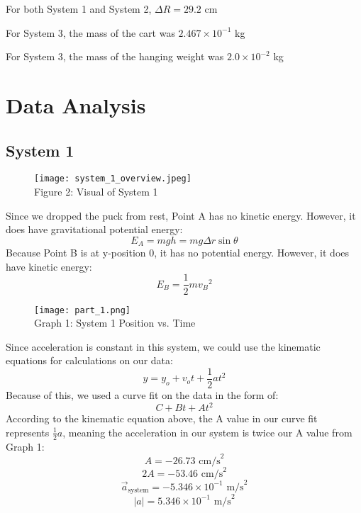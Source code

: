 \documentclass[fleqn]{article}
\begin{document}
For both System 1 and System 2, $\Delta R=29.2$ cm

For System 3, the mass of the cart was $2.467 \times 10^{-1}$ kg

For System 3, the mass of the hanging weight was $2.0 \times 10^{-2}$ kg

\section*{Data Analysis}
\subsection*{System 1}
\begin{figure}[H]
	\texttt{[image: system\_1\_overview.jpeg]}
	\\Figure 2: Visual of System 1
\end{figure}

Since we dropped the puck from rest, Point A has no kinetic energy. However, it does have gravitational potential energy:
\[ E_A=mgh=mg \Delta r \sin \theta \]
Because Point B is at y-position 0, it has no potential energy. However, it does have kinetic energy:
\[ E_B=\frac{1}{2} m{v_B}^2 \]
\begin{figure}[H]
	\centering
	\texttt{[image: part\_1.png]}
	\\Graph 1: System 1 Position vs. Time
\end{figure}
Since acceleration is constant in this system, we could use the kinematic equations for calculations on our data:
\[ y=y_o+v_ot+\frac{1}{2} at^2 \]
Because of this, we used a curve fit on the data in the form of:
\[ C+Bt+At^2 \]
According to the kinematic equation above, the A value in our curve fit represents $\frac{1}{2}a$, meaning the acceleration in our system is twice our A value from Graph 1:
\[ A=-26.73 \text{ cm/s}^2 \]
\[ 2A=-53.46 \text{ cm/s}^2 \]
\[ \vec{a}_{\text{system} }  =  -5.346\times10^{-1} \text{ m/s}^2\]
\[ |a| =5.346\times10^{-1} \text{ m/s}^2\]
\end{document}
